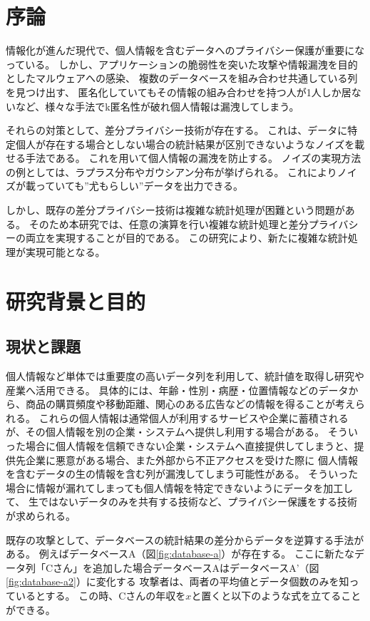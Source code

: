 \documentclass[a4paper,11pt]{jreport}
\begin{document}
\pagebreak \setcounter{page}{1}

\chapter{序論}

情報化が進んだ現代で、個人情報を含むデータへのプライバシー保護が重要になっている。
しかし、アプリケーションの脆弱性を突いた攻撃や情報漏洩を目的としたマルウェアへの感染、
複数のデータベースを組み合わせ共通している列を見つけ出す、
匿名化していてもその情報の組み合わせを持つ人が1人しか居ないなど、様々な手法でk匿名性\cite{k-anon}が破れ個人情報は漏洩してしまう。

それらの対策として、差分プライバシー技術が存在する。
これは、データに特定個人が存在する場合としない場合の統計結果が区別できないようなノイズを載せる手法である。
これを用いて個人情報の漏洩を防止する。
ノイズの実現方法の例としては、ラプラス分布やガウシアン分布が挙げられる。
これによりノイズが載っていても”尤もらしい”データを出力できる。

しかし、既存の差分プライバシー技術は複雑な統計処理が困難という問題がある。
そのため本研究では、任意の演算を行い複雑な統計処理と差分プライバシーの両立を実現することが目的である。
この研究により、新たに複雑な統計処理が実現可能となる。

\chapter{研究背景と目的}

\section{現状と課題}

個人情報など単体では重要度の高いデータ列を利用して、統計値を取得し研究や産業へ活用できる。
具体的には、年齢・性別・病歴・位置情報などのデータから、商品の購買頻度や移動距離、関心のある広告などの情報を得ることが考えられる。
これらの個人情報は通常個人が利用するサービスや企業に蓄積されるが、その個人情報を別の企業・システムへ提供し利用する場合がある。
そういった場合に個人情報を信頼できない企業・システムへ直接提供してしまうと、提供先企業に悪意がある場合、また外部から不正アクセスを受けた際に
個人情報を含むデータの生の情報を含む列が漏洩してしまう可能性がある。
そういった場合に情報が漏れてしまっても個人情報を特定できないようにデータを加工して、
生ではないデータのみを共有する技術など、プライバシー保護をする技術が求められる。

既存の攻撃として、データベースの統計結果の差分からデータを逆算する手法がある。
例えばデータベースA（図\ref{fig:database-a}）が存在する。
ここに新たなデータ列「Cさん」を追加した場合データベースAはデータベースA'（図\ref{fig:database-a2}）に変化する
攻撃者は、両者の平均値とデータ個数のみを知っているとする。
この時、Cさんの年収を$x$と置くと以下のような式を立てることができる。
\end{document}
